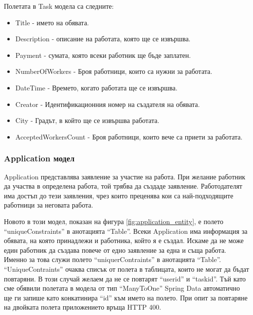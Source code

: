         Полетата в Task модела са следните:
        \begin{itemize}
            \item Title - името на обявата.
            \item Description - описание на работата, която ще се извършва.
            \item Payment - сумата, която всеки работник ще бъде заплатен.
            \item NumberOfWorkers - Броя работници, които са нужни за работата.
            \item DateTime - Времето, когато работата ще се извършва.
            \item Creator - Идентификационния номер на създателя на обявата.
            \item City - Градът, в който ще се извършва работата.
            \item AcceptedWorkersCount - Броя работници, които вече са приети за работата.
        \end{itemize}
        
        \newpage
        
         \subsubsection{Application модел}
        
        Application представлява заявление за участие на работа. При желание работник да участва в определена работа, той трябва да създаде заявление. Работодателят има достъп до тези заявления, чрез които преценява кои са най-подходящите работници за неговата работа.
        
        Новото в този модел, показан на фигура \ref{fig:application_entity}, е полето ``uniqueConstraints'' в анотацията ``Table''. Всеки Application има информация за обявата, на която принадлежи и работника, който я е създал. Искаме да не може един работник да създава повече от едно заявление за една и съща работа. Именно за това служи полето ``uniquerContraints'' в анотацията ``Table''. ``UniqueContraints'' очаква списък от полета в таблицата, които не могат да бъдат повтаряни. В този случай желаем да не се повтарят ``user\textunderscore id'' и ``task\textunderscore id''. Тъй като сме обявили полетата в модела от тип ``ManyToOne'' Spring Data автоматично ще ги запише като конкатинира ``\textunderscore id'' към името на полето.
        При опит за повтаряне на двойката полета приложението връща HTTP 400.
        
